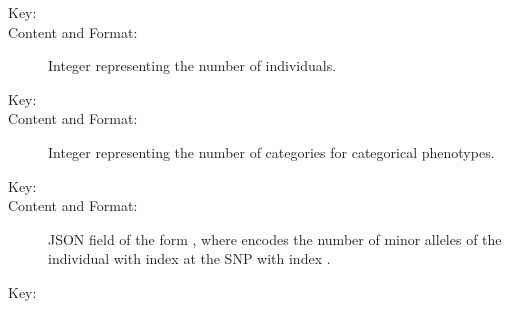 \documentclass[a4paper,10pt,english]{sphinxhowto}
\begin{document}
\begin{description}
\begin{description}
\begin{description}
\end{description}

\item[{\sphinxcode{\sphinxupquote{\textless{}NUM\_INDS\textgreater{}}}}] \leavevmode\begin{description}
\item[{Key:}] \leavevmode
{}

\item[{Content and Format:}] \leavevmode
Integer representing the number of individuals.

\end{description}

\item[{\sphinxcode{\sphinxupquote{\textless{}NUM\_CATEGORIES\textgreater{}}}}] \leavevmode\begin{description}
\item[{Key:}] \leavevmode
{}

\item[{Content and Format:}] \leavevmode
Integer representing the number of categories for categorical phenotypes.

\end{description}

\item[{\sphinxcode{\sphinxupquote{\textless{}GENOTYPE\_DATA\textgreater{}}}}] \leavevmode\begin{description}
\item[{Key:}] \leavevmode
{}

\item[{Content and Format:}] \leavevmode
JSON field of the form ,
where  encodes the number of minor alleles of the individual with index  at the SNP with index .

\end{description}

\item[{\sphinxcode{\sphinxupquote{\textless{}PHENOTYPE\_DATA\textgreater{}}}}] \leavevmode\begin{description}
\item[{Key:}] \leavevmode
{}


\end{description}
\end{description}
\end{description}
\end{document}
